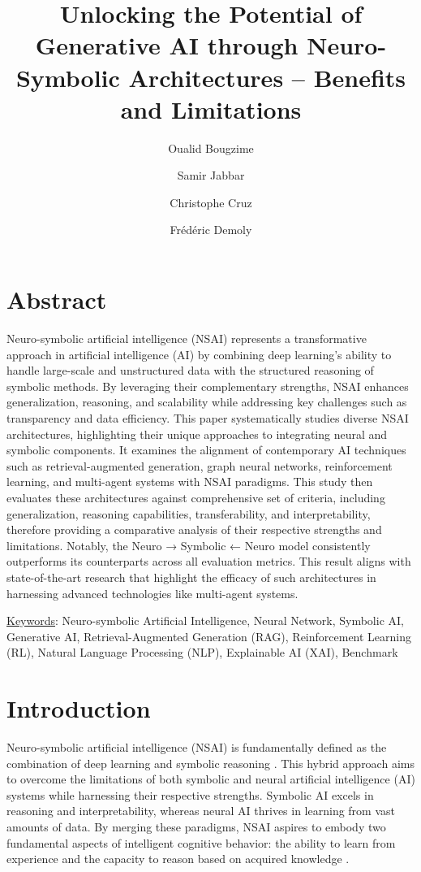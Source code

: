 \documentclass[12pt]{article}
\title{Unlocking the Potential of Generative AI through Neuro-Symbolic Architectures – Benefits and Limitations}
\author[1]{Oualid Bougzime}
\author[2]{Samir Jabbar}
\author[2]{Christophe Cruz}
\author[1,3]{Frédéric Demoly}
\affil[1]{ICB UMR 6303 CNRS, Université Marie et Louis Pasteur, UTBM, 90010 Belfort Cedex, France}
\affil[2]{ICB UMR 6303 CNRS, Université Bourgogne Europe, 21078 Dijon, France}
\affil[3]{Institut universitaire de France (IUF), Paris, France}
\date{}
\begin{document}
\maketitle
\doublespacing
\section*{Abstract}
Neuro-symbolic artificial intelligence (NSAI) represents a transformative approach in artificial intelligence (AI) by combining deep learning's ability to handle large-scale and unstructured data with the structured reasoning of symbolic methods. By leveraging their complementary strengths, NSAI enhances generalization, reasoning, and scalability while addressing key challenges such as transparency and data efficiency. This paper systematically studies diverse NSAI architectures, highlighting their unique approaches to integrating neural and symbolic components. It examines the alignment of  contemporary AI techniques such as retrieval-augmented generation, graph neural networks, reinforcement learning, and multi-agent systems with NSAI paradigms. This study then evaluates these architectures against comprehensive set of criteria, including generalization, reasoning capabilities, transferability, and interpretability, therefore providing a comparative analysis of their respective  strengths and limitations. Notably, the Neuro → Symbolic ← Neuro model consistently outperforms its counterparts across all evaluation metrics. This result aligns with state-of-the-art research that highlight the efficacy of such architectures in harnessing advanced technologies like multi-agent systems. 


\vspace*{0.5cm}


\noindent \underline{Keywords}: Neuro-symbolic Artificial Intelligence, Neural Network, Symbolic AI, Generative AI, Retrieval-Augmented Generation (RAG), Reinforcement Learning (RL), Natural Language Processing (NLP), Explainable AI (XAI), Benchmark

\section{Introduction}
Neuro-symbolic artificial intelligence (NSAI) is fundamentally defined as the combination of deep learning and symbolic reasoning \cite{garcez2023neurosymbolic}. This hybrid approach aims to overcome the limitations of both symbolic and neural artificial intelligence (AI) systems while harnessing their respective strengths. Symbolic AI excels in reasoning and interpretability, whereas neural AI thrives in learning from vast amounts of data. By merging these paradigms, NSAI aspires to embody two  fundamental aspects of intelligent cognitive behavior: the ability to learn from experience and the capacity to reason based on acquired knowledge \cite{garcez2023neurosymbolic, valiant2003three}.
\end{document}
